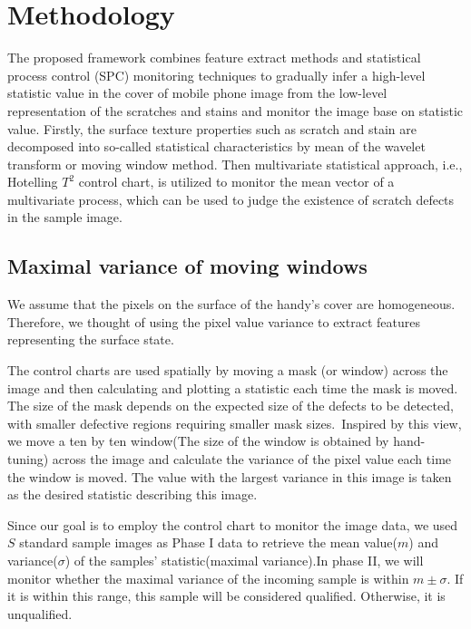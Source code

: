 \chapter{Methodology}
\label{cp:Methodology}

The proposed framework combines feature extract methods and statistical process control
(SPC) monitoring techniques to
gradually infer a high-level statistic value in the cover of mobile phone image from the low-level representation of the scratches and stains and monitor the image base on statistic value. Firstly, the surface texture properties such as scratch and stain are decomposed into so-called statistical characteristics by mean of the wavelet transform or moving window method. Then multivariate statistical approach, i.e., Hotelling $T^{2}$ control chart, is utilized to monitor the mean vector of a multivariate process, which can be used to judge the existence of scratch defects in the sample image.

\section{Maximal variance of moving windows}
We assume that the pixels on the surface of the handy's cover are homogeneous. Therefore, we thought of using the pixel value variance to extract features representing the surface state.



The control charts are used spatially by moving a mask (or window) across the image and then calculating and plotting a statistic each time the mask is moved. The size of the mask depends on the expected size of the defects to be detected, with smaller defective regions requiring smaller mask sizes.~\cite{megahed2011review}Inspired by this view, we move a ten by ten window(The size of the window is obtained by hand-tuning) across the image and calculate the variance of the pixel value each time the window is moved. The value with the largest variance in this image is taken as the desired statistic describing this image.

Since our goal is to employ the control chart to monitor the image data, we used $S$ standard sample images as Phase I data to retrieve the mean value($m$) and variance($ \sigma $) of the samples' statistic(maximal variance).In phase II, we will monitor whether the maximal variance of the incoming sample is within $m \pm \sigma$. If it is within this range, this sample will be considered qualified. Otherwise, it is unqualified.

